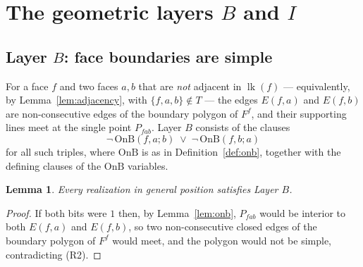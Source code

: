 \documentclass[11pt,reqno]{amsart}
\theoremstyle{plain}
\newtheorem{lemma}[theorem]{Lemma}
\theoremstyle{definition}
\newcommand{\link}{\operatorname{lk}}
\newcommand{\OnB}{\mathrm{OnB}}
\begin{document}
\section{The geometric layers \texorpdfstring{$B$ and $I$}{B and I}}\label{sec:geometric}

\subsection{Layer \texorpdfstring{$B$}{B}: face boundaries are simple}
For a face $f$ and two faces $a,b$ that are \emph{not} adjacent in $\link(f)$ --- equivalently, by
Lemma~\ref{lem:adjacency}, with $\{f,a,b\}\notin T$ --- the edges $E(f,a)$ and $E(f,b)$ are non-consecutive
edges of the boundary polygon of $F^f$, and their supporting lines meet at the single point $P_{fab}$.
Layer $B$ consists of the clauses
\[
    \neg\,\OnB(f,a;b)\;\vee\;\neg\,\OnB(f,b;a)
\]
for all such triples, where $\OnB$ is as in Definition~\ref{def:onb}, together with the defining
clauses of the $\OnB$ variables.

\begin{lemma}\label{lem:B}
Every realization in general position satisfies Layer $B$.
\end{lemma}

\begin{proof}
If both bits were $1$ then, by Lemma~\ref{lem:onb}, $P_{fab}$ would be interior to both $E(f,a)$ and
$E(f,b)$, so two non-consecutive closed edges of the boundary polygon of $F^f$ would meet, and the
polygon would not be simple, contradicting (R2).
\end{proof}
\end{document}
